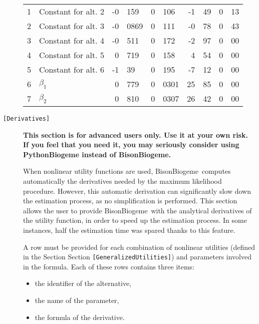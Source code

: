 \documentclass[12pt,a4paper]{article}
\newcommand{\specitem}[1]{\texttt{[#1]}}
\newcommand{\BBIOGEME}{BisonBiogeme}
\begin{document}
\begin{description}
\begin{center}
{\begin{tabular}{rlr@{.}lr@{.}lr@{.}lr@{.}l}
1 & Constant for alt. 2 & -0&159 & 0&106 & -1&49 & 0&13 \\
2 & Constant for alt. 3 & -0&0869 & 0&111 & -0&78 & 0&43 \\
3 & Constant for alt. 4 & -0&511 & 0&172 & -2&97 & 0&00 \\
4 & Constant for alt. 5 & 0&719 & 0&158 & 4&54 & 0&00 \\
5 & Constant for alt. 6 & -1&39 & 0&195 & -7&12 & 0&00 \\
6 & $\beta_1$ & 0&779 & 0&0301 & 25&85 & 0&00 \\
7 & $\beta_2$ & 0&810 & 0&0307 & 26&42 & 0&00 \\
\hline

\end{tabular}
}
\end{center}

\item[\specitem{Derivatives}]

\textbf{This section is for advanced users only. Use it at your own
  risk. If you feel that you need it, you may seriously consider using
PythonBiogeme instead of BisonBiogeme.}

When nonlinear utility functions are used, \BBIOGEME\ computes
automatically the derivatives needed by the maximum likelihood
procedure. However, this automatic derivation can significantly slow
down the estimation process, as no simplification is performed. This
section allows the user to provide \BBIOGEME\ with the analytical
derivatives of the utility function, in order to speed up the estimation process. In some instances, half the estimation time was spared thanks to this feature.  

A row must be provided for each
combination of nonlinear utilities (defined in the Section
Section \verb+[GeneralizedUtilities]+) and
parameters involved in the formula. Each of these rows contains three
items:
\begin{itemize}
\item the identifier of the alternative,
\item the name of the parameter,
\item the formula of the derivative.
\end{itemize}


\end{description}
\end{document}
